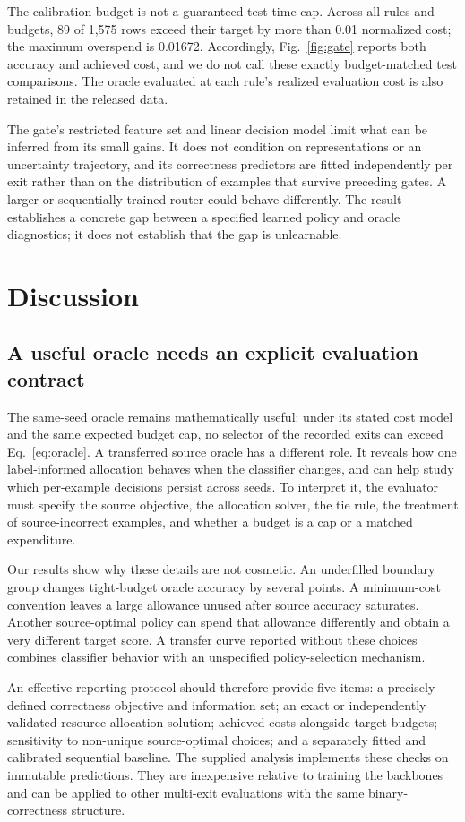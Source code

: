 \documentclass[11pt,a4paper]{article}
\begin{document}
The calibration budget is not a guaranteed test-time cap. Across all rules and budgets, 89 of 1,575 rows exceed their target by more than 0.01 normalized cost; the maximum overspend is 0.01672. Accordingly, Fig.~\ref{fig:gate} reports both accuracy and achieved cost, and we do not call these exactly budget-matched test comparisons. The oracle evaluated at each rule's realized evaluation cost is also retained in the released data.

The gate's restricted feature set and linear decision model limit what can be inferred from its small gains. It does not condition on representations or an uncertainty trajectory, and its correctness predictors are fitted independently per exit rather than on the distribution of examples that survive preceding gates. A larger or sequentially trained router could behave differently. The result establishes a concrete gap between a specified learned policy and oracle diagnostics; it does not establish that the gap is unlearnable.

\section{Discussion}
\subsection{A useful oracle needs an explicit evaluation contract}
The same-seed oracle remains mathematically useful: under its stated cost model and the same expected budget cap, no selector of the recorded exits can exceed Eq.~\eqref{eq:oracle}. A transferred source oracle has a different role. It reveals how one label-informed allocation behaves when the classifier changes, and can help study which per-example decisions persist across seeds. To interpret it, the evaluator must specify the source objective, the allocation solver, the tie rule, the treatment of source-incorrect examples, and whether a budget is a cap or a matched expenditure.

Our results show why these details are not cosmetic. An underfilled boundary group changes tight-budget oracle accuracy by several points. A minimum-cost convention leaves a large allowance unused after source accuracy saturates. Another source-optimal policy can spend that allowance differently and obtain a very different target score. A transfer curve reported without these choices combines classifier behavior with an unspecified policy-selection mechanism.

An effective reporting protocol should therefore provide five items: a precisely defined correctness objective and information set; an exact or independently validated resource-allocation solution; achieved costs alongside target budgets; sensitivity to non-unique source-optimal choices; and a separately fitted and calibrated sequential baseline. The supplied analysis implements these checks on immutable predictions. They are inexpensive relative to training the backbones and can be applied to other multi-exit evaluations with the same binary-correctness structure.
\end{document}
